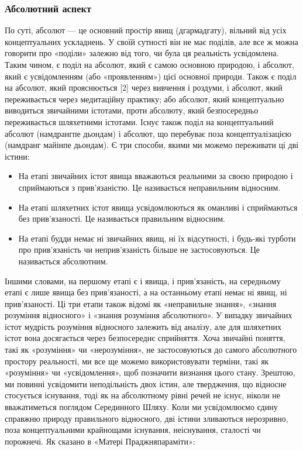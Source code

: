 \documentclass{article}
\begin{document}
\subsubsection{Абсолютний аспект}

По суті, абсолют — це основний простір явищ (дгармадгату), вільний від усіх концептуальних ускладнень. У своїй сутності він не має поділів, але все ж можна говорити про «поділи» залежно від того, чи була ця реальність усвідомлена. Таким чином, є поділ на абсолют, який є самою основною природою, і абсолют, який є усвідомленням (або «проявленням») цієї основної природи. Також є поділ на абсолют, який прояснюється [2] через вивчення і роздуми, і абсолют, який переживається через медитаційну практику; або абсолют, який концептуально виводиться звичайними істотами, проти абсолюту, який безпосередньо переживається шляхетними істотами. Існує також поділ на концептуальний абсолют (намдрангпе дьондам) і абсолют, що перебуває поза концептуалізацією (намдранг майінпе дьондам). Є три способи, якими ми можемо переживати ці дві істини:

\begin{itemize}
\item На етапі звичайних істот явища вважаються реальними за своєю природою і сприймаються з прив’язаністю. Це називається неправильним відносним.
\item На етапі шляхетних істот явища усвідомлюються як оманливі і сприймаються без прив’язаності. Це називається правильним відносним.
\item На етапі будди немає ні звичайних явищ, ні їх відсутності, і будь-які турботи про прив’язаність чи неприв’язаність більше не застосовуються. Це називається абсолютним.
\end{itemize}

Іншими словами, на першому етапі є і явища, і прив’язаність, на середньому етапі є лише явища без прив’язаності, а на останньому етапі немає ні явищ, ні прив’язаності. Ці три етапи також відомі як «неправильне знання», «знання розуміння відносного» і «знання розуміння абсолютного». У випадку звичайних істот мудрість розуміння відносного залежить від аналізу, але для шляхетних істот вона досягається через безпосереднє сприйняття. Хоча звичайні поняття, такі як «розуміння» чи «нерозуміння», не застосовуються до самого абсолютного простору реальності, ми все ще можемо використовувати терміни, такі як «розуміння» чи «усвідомлення», щоб позначити визнання цього стану. Зрештою, ми повинні усвідомити неподільність двох істин, але твердження, що відносне стосується існування, тоді як на абсолютному рівні речей не існує, ніколи не вважатиметься поглядом Серединного Шляху. Коли ми усвідомлюємо єдину справжню природу правильного відносного, дві істини зливаються нерозривно, поза концептуальними крайнощами існування, неіснування, сталості чи порожнечі. Як сказано в «Матері Праджняпараміти»:
\end{document}

